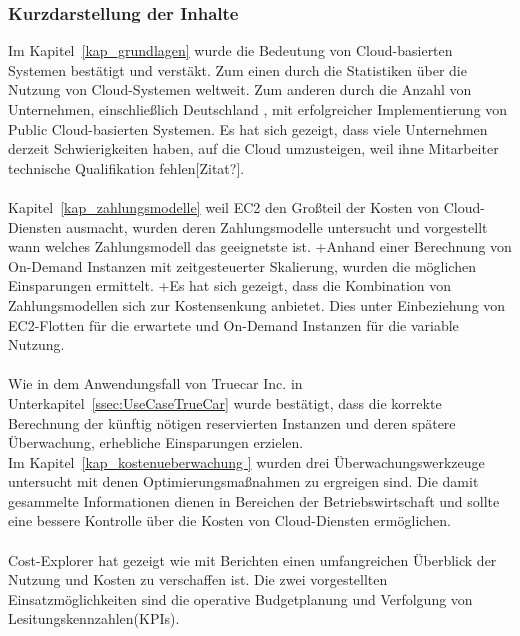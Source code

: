 \subsubsection*{Kurzdarstellung der Inhalte}
Im Kapitel~\ref{kap_grundlagen} %
wurde die Bedeutung von Cloud-basierten Systemen bestätigt und verstäkt. Zum einen durch die Statistiken\cite{STA1,STA2,STA4} über die Nutzung von Cloud-Systemen weltweit. Zum anderen durch die Anzahl von Unternehmen, einschließlich Deutschland%
, mit erfolgreicher Implementierung von Public Cloud-basierten Systemen. Es hat sich gezeigt, dass viele Unternehmen derzeit Schwierigkeiten haben, auf die Cloud umzusteigen, weil ihne Mitarbeiter technische Qualifikation fehlen[Zitat?]. 
\\\\
Kapitel~\ref{kap_zahlungsmodelle} weil EC2 den Großteil der Kosten von Cloud-Diensten ausmacht, wurden deren Zahlungsmodelle untersucht und vorgestellt wann welches Zahlungsmodell das geeignetste ist. 
+Anhand einer Berechnung von On-Demand Instanzen mit zeitgesteuerter Skalierung, wurden die möglichen Einsparungen ermittelt. +Es hat sich gezeigt, dass die Kombination von Zahlungsmodellen sich zur Kostensenkung anbietet. Dies unter Einbeziehung von EC2-Flotten für die erwartete und On-Demand Instanzen für die variable Nutzung.%
%
\\\\
Wie in dem Anwendungsfall von Truecar Inc. in Unterkapitel~\ref{ssec:UseCaseTrueCar} %
wurde bestätigt, dass die korrekte Berechnung der künftig nötigen reservierten Instanzen und deren spätere Überwachung, erhebliche Einsparungen erzielen.
\\
Im Kapitel~\ref{kap_kostenueberwachung } wurden drei Überwachungswerkzeuge untersucht mit denen Optimierungsmaßnahmen zu ergreigen sind. Die damit gesammelte Informationen dienen in Bereichen der Betriebswirtschaft und sollte eine bessere Kontrolle über die Kosten von Cloud-Diensten ermöglichen.
\\\\
Cost-Explorer hat gezeigt wie mit Berichten einen umfangreichen Überblick der Nutzung und Kosten zu verschaffen ist. Die zwei vorgestellten Einsatzmöglichkeiten sind die operative Budgetplanung und Verfolgung von Lesitungskennzahlen(KPIs).
